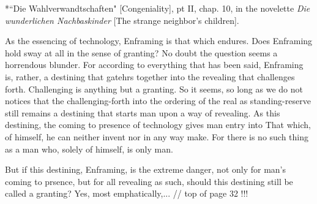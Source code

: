 *``Die Wahlverwandtschaften" [Congeniality], pt II, chap. 10, in the novelette \textit{Die wunderlichen Nachbaskinder} [The strange neighbor's children].

As the essencing of technology, Enframing is that which endures. Does Enframing hold sway at all in the sense of granting? No doubt the question seems a horrendous blunder. For according to everything that has been said, Enframing is, rather, a destining that gatehrs together into the revealing that challenges forth. Challenging is anything but a granting. So it seems, so long as we do not notices that the challenging-forth into the ordering of the real as standing-reserve still remains a destining that starts man upon a way of revealing. As this destining, the coming to presence of technology gives man entry into That which, of himself, he can neither invent nor in any way make. For there is no such thing as a man who, solely of himself, is only man.

But if this destining, Enframing, is the extreme danger, not only for man's coming to prsence, but for all revealing as such, should this destining still be called a granting? Yes, most emphatically,...
// top of page 32 !!!

